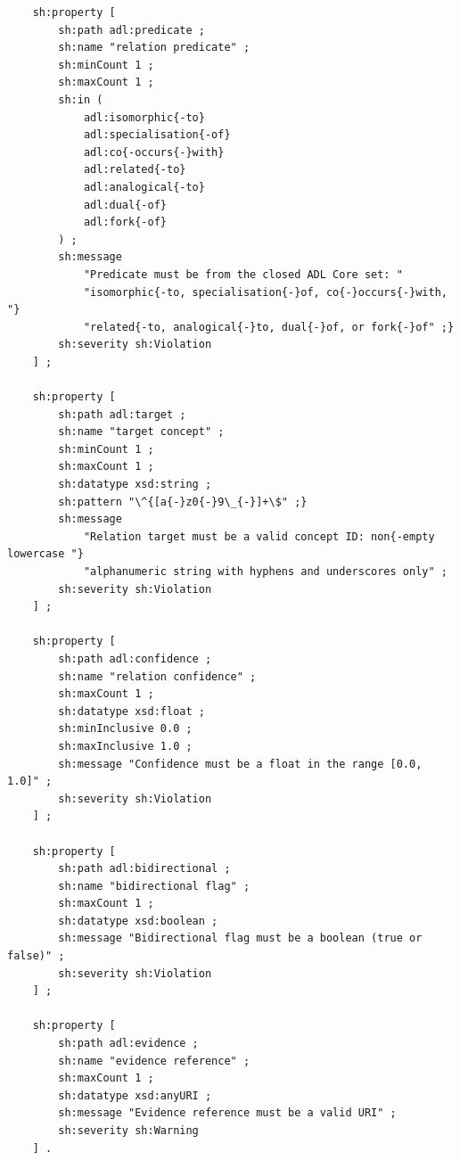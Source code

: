 \begin{lstlisting}
    sh:property [
        sh:path adl:predicate ;
        sh:name "relation predicate" ;
        sh:minCount 1 ;
        sh:maxCount 1 ;
        sh:in (
            adl:isomorphic{-to}
            adl:specialisation{-of}
            adl:co{-occurs{-}with}
            adl:related{-to}
            adl:analogical{-to}
            adl:dual{-of}
            adl:fork{-of}
        ) ;
        sh:message
            "Predicate must be from the closed ADL Core set: "
            "isomorphic{-to, specialisation{-}of, co{-}occurs{-}with, "}
            "related{-to, analogical{-}to, dual{-}of, or fork{-}of" ;}
        sh:severity sh:Violation
    ] ;

    sh:property [
        sh:path adl:target ;
        sh:name "target concept" ;
        sh:minCount 1 ;
        sh:maxCount 1 ;
        sh:datatype xsd:string ;
        sh:pattern "\^{[a{-}z0{-}9\_{-}]+\$" ;}
        sh:message
            "Relation target must be a valid concept ID: non{-empty lowercase "}
            "alphanumeric string with hyphens and underscores only" ;
        sh:severity sh:Violation
    ] ;

    sh:property [
        sh:path adl:confidence ;
        sh:name "relation confidence" ;
        sh:maxCount 1 ;
        sh:datatype xsd:float ;
        sh:minInclusive 0.0 ;
        sh:maxInclusive 1.0 ;
        sh:message "Confidence must be a float in the range [0.0, 1.0]" ;
        sh:severity sh:Violation
    ] ;

    sh:property [
        sh:path adl:bidirectional ;
        sh:name "bidirectional flag" ;
        sh:maxCount 1 ;
        sh:datatype xsd:boolean ;
        sh:message "Bidirectional flag must be a boolean (true or false)" ;
        sh:severity sh:Violation
    ] ;

    sh:property [
        sh:path adl:evidence ;
        sh:name "evidence reference" ;
        sh:maxCount 1 ;
        sh:datatype xsd:anyURI ;
        sh:message "Evidence reference must be a valid URI" ;
        sh:severity sh:Warning
    ] .
\end{lstlisting}
